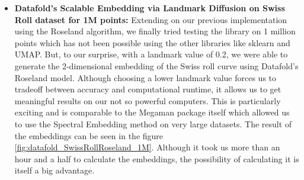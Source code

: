 \begin{itemize}
\begin{itemize}
	      	\item \textbf{Datafold's Scalable Embedding via Landmark Diffusion on Swiss Roll dataset for 1M points:}
	      	      Extending on our previous implementation using the Roseland algorithm\cite{Roseland}, we finally tried testing the library on 1 million points which has not been possible using the other libraries like sklearn and UMAP. But, to our surprise, with a landmark value of 0.2, we were able to generate the 2-dimensional embedding of the Swiss roll curve using Datafold's Roseland model. Although choosing a lower landmark value forces us to tradeoff between accuracy and computational runtime, it allows us to get meaningful results on our not so powerful computers. This is particularly exciting and is comparable to the Megaman package itself which allowed us to use the Spectral Embedding method on very large datasets. The result of the embeddings can be seen in the figure \ref{fig:datafold_SwissRollRoseland_1M}. Although it took us more than an hour and a half to calculate the embeddings, the possibility of calculating it is itself a big advantage.


\end{itemize}
\end{itemize}
